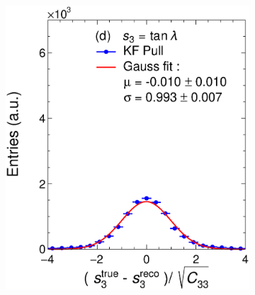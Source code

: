 \begin{figure}[t]
\begin{subfigure}{0.32\textwidth}
         \caption{}
         \label{fig:resp2KF_GArLite_ILRM+KF}
     \end{subfigure}
          \begin{subfigure}{0.32\textwidth}
         \centering
         \includegraphics[width=\textwidth]{figures/ch4-KF_NDGArLite/MC/ILRM+KF/UnitKFEnd_p3.eps}
         \caption{}
         \label{fig:resp3KF_GArLite_ILRM+KF}
     \end{subfigure}
     \begin{subfigure}{0.32\textwidth}
         \centering

\end{subfigure}
\end{figure}
